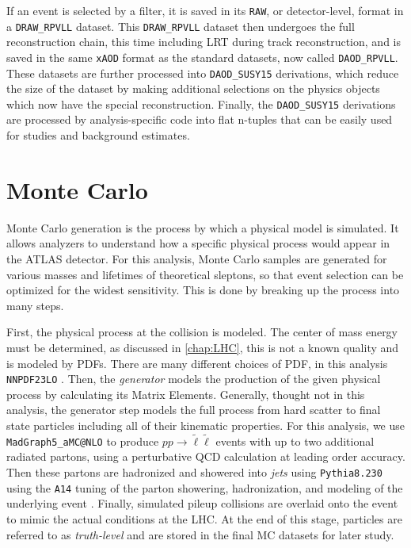 If an event is selected by a filter, it is saved in its \texttt{RAW}, or detector-level, format in a \texttt{DRAW\_RPVLL} dataset. This \texttt{DRAW\_RPVLL} dataset then undergoes the full reconstruction chain, this time including \ac{LRT} during track reconstruction, and is saved in the same \texttt{xAOD} format as the standard datasets, now called \texttt{DAOD\_RPVLL}. These datasets are further processed into \texttt{DAOD\_SUSY15} derivations, which reduce the size of the dataset by making additional selections on the physics objects which now have the special reconstruction. Finally, the \texttt{DAOD\_SUSY15} derivations are processed by analysis-specific code into flat n-tuples that can be easily used for studies and background estimates. 

\section{Monte Carlo}

Monte Carlo generation is the process by which a physical model is simulated. It allows analyzers to understand how a specific physical process would appear in the \ac{ATLAS} detector. For this analysis, Monte Carlo samples are generated for various masses and lifetimes of theoretical sleptons, so that event selection can be optimized for the widest sensitivity. This is done by breaking up the process into many steps. 


First, the physical process at the collision is modeled. The center of mass energy must be determined, as discussed in \autoref{chap:LHC}, this is not a known quality and is modeled by \ac{PDF}s. There are many different choices of \ac{PDF}, in this analysis \texttt{NNPDF23LO} \cite{pdfs}. Then, the \emph{generator} models the production of the given physical process by calculating its Matrix Elements. Generally, thought not in this analysis, the generator step models the full process from hard scatter to final state particles including all of their kinematic properties. For this analysis, we use \texttt{MadGraph5\_aMC@NLO} \cite{madgraph} to produce $pp \rightarrow \tilde{\ell}\tilde{\ell}$ events with up to two additional radiated partons, using a perturbative \ac{QCD} calculation at leading order accuracy. Then these partons are hadronized and showered into \emph{jets} using \texttt{Pythia8.230} using the \texttt{A14} tuning of the parton showering, hadronization, and modeling of the underlying event \cite{atlas-pythia}. Finally, simulated pileup collisions are overlaid onto the event to mimic the actual conditions at the \ac{LHC}. At the end of this stage, particles are referred to as \emph{truth-level} and are stored in the final \ac{MC} datasets for later study.

